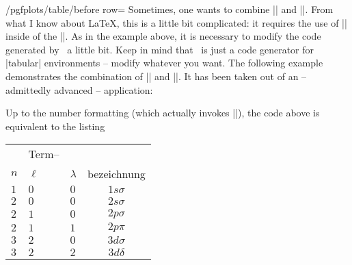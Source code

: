 \begin{key}{/pgfplots/table/before row=}
	Sometimes, one wants to combine |\multicolumn| and |\rowcolor|. From what I know about \LaTeX, this is a little bit complicated: it requires the use of |\columncolor| inside of the |\multicolumn|. As in the example above, it is necessary to modify the code generated by \PGFPlotstable\ a little bit. Keep in mind that \PGFPlotstable\ is just a code generator for |tabular| environments -- modify whatever you want. The following example demonstrates the combination of |\multicolumn| and |\rowcolor|. It has been taken out of an -- admittedly advanced -- application:
\begin{codeexample}[]
\end{codeexample}
	
	Up to the number formatting (which actually invokes |\pgfmathprintnumber|), the code above is equivalent to the listing
\begin{codeexample}
\begin{tabular}{|C|C|C|c|}
\hline
{}  & Term--\\
 $n$ & $\ell$ & $\lambda$ & bezeichnung\\
\hline
$1$ & $0$ & $0$ & $1 s\sigma$ \\
$2$ & $0$ & $0$ & $2 s\sigma$ \\
$2$ & $1$ & $0$ & $2 p\sigma$ \\
$2$ & $1$ & $1$ & $2 p \pi$ \\
$3$ & $2$ & $0$ & $3 d\sigma$ \\
$3$ & $2$ & $2$ & $3 d\delta$ \\
\hline
\end{tabular}
\end{codeexample}
	

\end{key}
